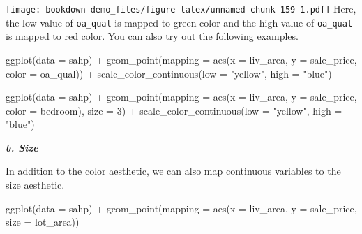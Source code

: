 \documentclass[
]{book}
\newenvironment{Shaded}{\begin{snugshade}}{\end{snugshade}}
\newcommand{\AttributeTok}[1]{\textcolor[rgb]{0.77,0.63,0.00}{#1}}
\newcommand{\DecValTok}[1]{\textcolor[rgb]{0.00,0.00,0.81}{#1}}
\newcommand{\FunctionTok}[1]{\textcolor[rgb]{0.00,0.00,0.00}{#1}}
\newcommand{\NormalTok}[1]{#1}
\newcommand{\SpecialCharTok}[1]{\textcolor[rgb]{0.00,0.00,0.00}{#1}}
\newcommand{\StringTok}[1]{\textcolor[rgb]{0.31,0.60,0.02}{#1}}
\begin{document}
\texttt{[image: bookdown-demo\_files/figure-latex/unnamed-chunk-159-1.pdf]}
Here, the low value of \texttt{oa\_qual} is mapped to green color and the high value of \texttt{oa\_qual} is mapped to red color. You can also try out the following examples.

\begin{Shaded}
\begin{Highlighting}[]
\FunctionTok{ggplot}\NormalTok{(}\AttributeTok{data =}\NormalTok{ sahp) }\SpecialCharTok{+} \FunctionTok{geom\_point}\NormalTok{(}\AttributeTok{mapping =} \FunctionTok{aes}\NormalTok{(}\AttributeTok{x =}\NormalTok{ liv\_area, }\AttributeTok{y =}\NormalTok{ sale\_price, }\AttributeTok{color =}\NormalTok{ oa\_qual)) }\SpecialCharTok{+} \FunctionTok{scale\_color\_continuous}\NormalTok{(}\AttributeTok{low =} \StringTok{"yellow"}\NormalTok{, }\AttributeTok{high =} \StringTok{"blue"}\NormalTok{)}
\end{Highlighting}
\end{Shaded}

\begin{Shaded}
\begin{Highlighting}[]
\FunctionTok{ggplot}\NormalTok{(}\AttributeTok{data =}\NormalTok{ sahp) }\SpecialCharTok{+} \FunctionTok{geom\_point}\NormalTok{(}\AttributeTok{mapping =} \FunctionTok{aes}\NormalTok{(}\AttributeTok{x =}\NormalTok{ liv\_area, }\AttributeTok{y =}\NormalTok{ sale\_price, }\AttributeTok{color =}\NormalTok{ bedroom), }\AttributeTok{size =} \DecValTok{3}\NormalTok{) }\SpecialCharTok{+} \FunctionTok{scale\_color\_continuous}\NormalTok{(}\AttributeTok{low =} \StringTok{"yellow"}\NormalTok{, }\AttributeTok{high =} \StringTok{"blue"}\NormalTok{)}
\end{Highlighting}
\end{Shaded}

\textbf{\emph{b. Size}}

In addition to the color aesthetic, we can also map continuous variables to the size aesthetic.

\begin{Shaded}
\begin{Highlighting}[]
\FunctionTok{ggplot}\NormalTok{(}\AttributeTok{data =}\NormalTok{ sahp) }\SpecialCharTok{+} \FunctionTok{geom\_point}\NormalTok{(}\AttributeTok{mapping =} \FunctionTok{aes}\NormalTok{(}\AttributeTok{x =}\NormalTok{ liv\_area, }\AttributeTok{y =}\NormalTok{ sale\_price, }\AttributeTok{size =}\NormalTok{ lot\_area))}
\end{Highlighting}
\end{Shaded}
\end{document}
